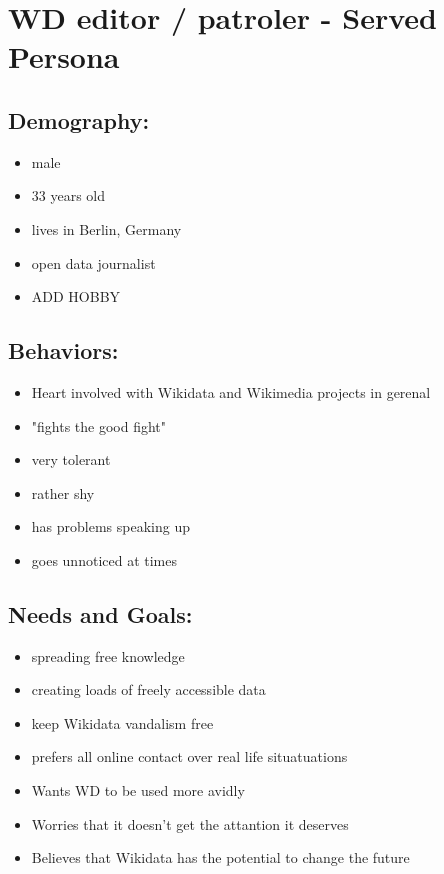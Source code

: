 \documentclass{article}
\date{02.12.2015}
\begin{document}
\section{WD editor / patroler - Served Persona}

\subsection{Demography:}
\begin{itemize}
 \item male
 \item 33 years old
 \item lives in Berlin, Germany
 \item open data journalist
 \item ADD HOBBY
\end{itemize}

\subsection{Behaviors:}
\begin{itemize}
\item Heart involved with Wikidata and Wikimedia projects in gerenal
\item "fights the good fight"
\item very tolerant
\item rather shy
\item has problems speaking up
\item goes unnoticed at times
\end{itemize}

\subsection{Needs and Goals:}
\begin{itemize}
 \item spreading free knowledge
 \item creating loads of freely accessible data
 \item keep Wikidata vandalism free
 \item prefers all online contact over real life situatuations
 \item Wants WD to be used more avidly  
 \item Worries that it doesn't get the attantion it deserves
 \item Believes that Wikidata has the potential to change the future
\end{itemize}
\end{document}
